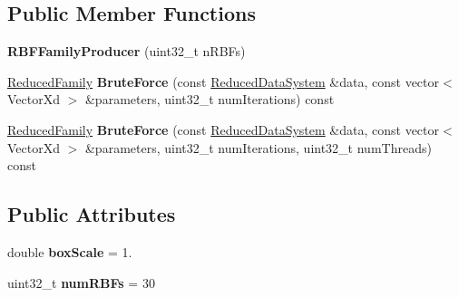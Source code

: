 \subsection*{Public Member Functions}
\begin{DoxyCompactItemize}
\item 
\hypertarget{struct_d_r_d_s_p_1_1_r_b_f_family_producer_a0282e37f5ef5428167e10724710c20e7}{{\bfseries R\-B\-F\-Family\-Producer} (uint32\-\_\-t n\-R\-B\-Fs)}\label{struct_d_r_d_s_p_1_1_r_b_f_family_producer_a0282e37f5ef5428167e10724710c20e7}

\item 
\hypertarget{struct_d_r_d_s_p_1_1_r_b_f_family_producer_a6e1dcce56a93b0504c2b1c4d36cc7ff3}{\hyperlink{struct_d_r_d_s_p_1_1_p_map_family}{Reduced\-Family} {\bfseries Brute\-Force} (const \hyperlink{struct_d_r_d_s_p_1_1_reduced_data_system}{Reduced\-Data\-System} \&data, const vector$<$ Vector\-Xd $>$ \&parameters, uint32\-\_\-t num\-Iterations) const }\label{struct_d_r_d_s_p_1_1_r_b_f_family_producer_a6e1dcce56a93b0504c2b1c4d36cc7ff3}

\item 
\hypertarget{struct_d_r_d_s_p_1_1_r_b_f_family_producer_af58f8bd5bdcd8730766c1bc186f4372c}{\hyperlink{struct_d_r_d_s_p_1_1_p_map_family}{Reduced\-Family} {\bfseries Brute\-Force} (const \hyperlink{struct_d_r_d_s_p_1_1_reduced_data_system}{Reduced\-Data\-System} \&data, const vector$<$ Vector\-Xd $>$ \&parameters, uint32\-\_\-t num\-Iterations, uint32\-\_\-t num\-Threads) const }\label{struct_d_r_d_s_p_1_1_r_b_f_family_producer_af58f8bd5bdcd8730766c1bc186f4372c}

\end{DoxyCompactItemize}
\subsection*{Public Attributes}
\begin{DoxyCompactItemize}
\item 
\hypertarget{struct_d_r_d_s_p_1_1_r_b_f_family_producer_a83431f5c3b6616def3277dbc57fe412b}{double {\bfseries box\-Scale} = 1.}\label{struct_d_r_d_s_p_1_1_r_b_f_family_producer_a83431f5c3b6616def3277dbc57fe412b}

\item 
\hypertarget{struct_d_r_d_s_p_1_1_r_b_f_family_producer_ad65e12c9e040fba915381b0af0031b21}{uint32\-\_\-t {\bfseries num\-R\-B\-Fs} = 30}\label{struct_d_r_d_s_p_1_1_r_b_f_family_producer_ad65e12c9e040fba915381b0af0031b21}

\end{DoxyCompactItemize}
